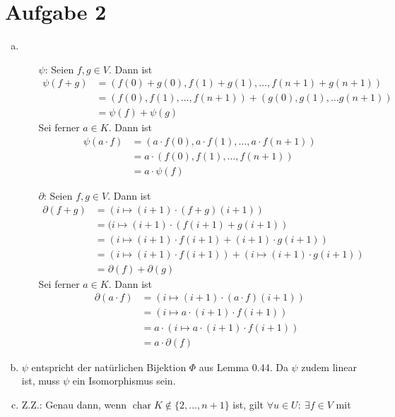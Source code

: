 \documentclass{article}
\begin{document}
	\section*{Aufgabe 2}
	\begin{enumerate}[(a)]
		\item \begin{itemize}
			\item[$\psi$:] Seien $f, g\in V$. Dann ist
			\begin{align*}
				\psi(f+g) &= (f(0) + g(0), f(1) + g(1), \dots, f(n+1)+g(n+1))\\
				&= (f(0), f(1), \dots, f(n+1)) + (g(0), g(1), \dots g(n+1))\\
				&=\psi(f) + \psi(g)
			\end{align*}
			Sei ferner $a\in K$. Dann ist
			\begin{align*}
				\psi(a\cdot f) &= (a\cdot f(0), a\cdot f(1), \dots, a\cdot f(n+1))\\
				&= a\cdot (f(0), f(1), \dots, f(n+1))\\
				&= a\cdot \psi(f)
			\end{align*}
			\item[$\partial$:] Seien $f, g\in V$. Dann ist
			\begin{align*}
			\partial(f+g) &= (i\mapsto (i+1)\cdot (f+g)(i+1))\\
			&= (i\mapsto (i+1)\cdot (f(i+1) + g(i+1))\\
			&= (i\mapsto (i+1) \cdot f(i+1) + (i+1) \cdot g(i+1))\\
			&= (i\mapsto (i+1)\cdot f(i+1)) + (i\mapsto (i+1) \cdot g(i+1))\\
			&=\partial(f) + \partial(g)
			\end{align*}
			Sei ferner $a\in K$. Dann ist
			\begin{align*}
			\partial(a\cdot f) &= (i\mapsto (i+1)\cdot (a\cdot f)(i+1))\\
			&= (i\mapsto a\cdot (i+1)\cdot f(i+1))\\
			&= a\cdot (i\mapsto a\cdot (i+1)\cdot f(i+1))\\
			&= a\cdot \partial(f)
			\end{align*}
		\end{itemize}
		\item $\psi$ entspricht der natürlichen Bijektion $\Phi$ aus Lemma 0.44. Da $\psi$ zudem linear ist, muss $\psi$ ein Isomorphismus sein.
		\item Z.Z.: Genau dann, wenn $\operatorname{char} K \notin \{2,\dots, n+1\}$ ist, gilt $\forall u\in U:\ \exists f\in V$ mit 

\end{enumerate}
\end{document}
